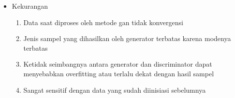 \begin{enumerate}
\begin{itemize}
\begin{enumerate}
            \end{enumerate}
              \item Kekurangan
              \begin{enumerate}  
                \item Data saat diproses oleh metode gan tidak konvergensi
                \item Jenis sampel yang dihasilkan oleh generator terbatas karena modenya terbatas
                \item Ketidak seimbangnya antara generator dan discriminator dapat menyebabkan overfitting atau terlalu dekat dengan hasil sampel
                \item Sangat sensitif dengan data yang sudah diinisiasi sebelumnya
              \end{enumerate}
            \end{itemize}

        \end{enumerate}

